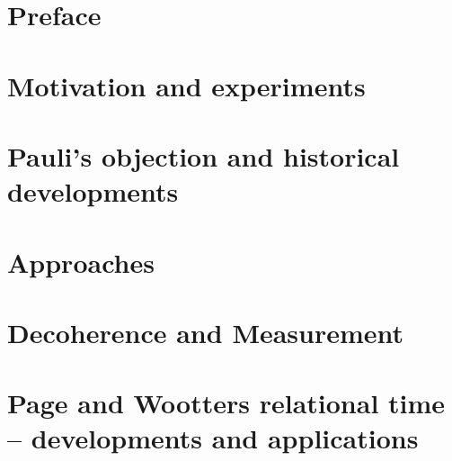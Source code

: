 




\frontmatter

\maketitle

\tableofcontents

\listoffigures
 
\listoftables

\chapter*{Preface}


\mainmatter

\chapter{Motivation and experiments}

\fi

\chapter{Pauli's objection and historical developments}


\chapter{Approaches}

\fi

\chapter{Decoherence and Measurement}









\chapter{Page and Wootters relational time -- developments and applications}
  \label{ch:pw}



\fi

